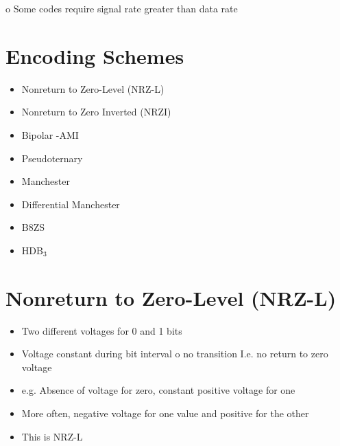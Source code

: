 \documentclass[10pt]{article}
\begin{document}
o Some codes require signal rate greater than data rate

\section{Encoding Schemes}
\begin{itemize}
  \item Nonreturn to Zero-Level (NRZ-L)

  \item Nonreturn to Zero Inverted (NRZI)

  \item Bipolar -AMI

  \item Pseudoternary

  \item Manchester

  \item Differential Manchester

  \item B8ZS

  \item $\mathrm{HDB}_{3}$

\end{itemize}

\section{Nonreturn to Zero-Level (NRZ-L)}
\begin{itemize}
  \item Two different voltages for 0 and 1 bits

  \item Voltage constant during bit interval o no transition I.e. no return to zero voltage

  \item e.g. Absence of voltage for zero, constant positive voltage for one

  \item More often, negative voltage for one value and positive for the other

  \item This is NRZ-L

\end{itemize}
\end{document}

